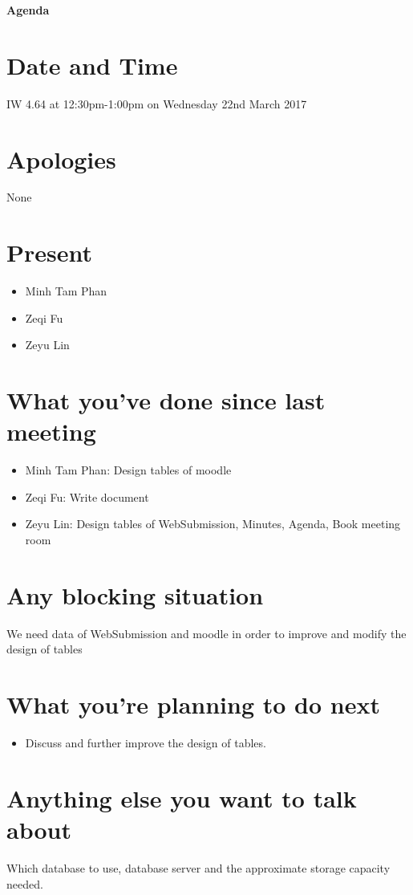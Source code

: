 \documentclass[11pt, a4paper]{article}
\begin{document}



\vspace*{15pt}

\begin{center}
\huge \bf Agenda
\end{center}




\section{Date and Time}
IW 4.64 at 12:30pm-1:00pm on Wednesday 22nd March 2017

\section{Apologies}
None


\section{Present}
\begin{itemize}
	\item Minh Tam Phan
	\item Zeqi Fu
	\item Zeyu Lin
\end{itemize}

\section{What you've done since last meeting}
\begin{itemize}
	\item Minh Tam Phan: Design tables of moodle
	\item Zeqi Fu: Write document
	\item Zeyu Lin: Design tables of WebSubmission, Minutes, Agenda, Book meeting room
\end{itemize}




\section{Any blocking situation}
We need data of WebSubmission and moodle in order to improve and modify the design of tables

\section{What you're planning to do next}
\begin{itemize}
	\item Discuss and further improve the design of tables.
\end{itemize}

\section{Anything else you want to talk about}
Which database to use, database server and the approximate storage capacity needed.
\end{document}
